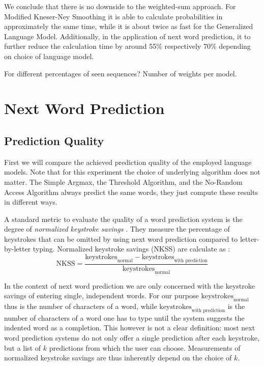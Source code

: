 We conclude that there is no downside to the weighted-sum approach.
For Modified Kneser-Ney Smoothing it is able to calculate probabilities in
approximately the same time, while it is about twice as fast for the
Generalized Language Model.
Additionally, in the application of next word prediction,  it to further reduce
the calculation time by around 55\% respectively 70\% depending on choice
of language model.

\begin{draft}
For different percentages of seen sequences?
Number of weights per model.
\end{draft}

\section{Next Word Prediction}
\label{sec:evaluation-topkjoin}

\subsection{Prediction Quality}
\label{subsec:evaluation-topkjoin-quality}

First we will compare the achieved prediction quality of the employed
language models.
Note that for this experiment the choice of underlying algorithm does not
matter.
The Simple Argmax, the Threshold Algorithm, and the No-Random Access Algorithm
always predict the same words, they just compute these results in different
ways.

A standard metric to evaluate the quality of a word prediction system is the
degree of \emph{normalized keystroke savings}
\parencite{Swiffin1987,Bickel2005,Trnka2011}.
They measure the percentage of keystrokes that can be omitted by using next
word prediction compared to letter-by-letter typing.
Normalized keystroke savings (NKSS) are calculate as \parencite{Trnka2011}:
\begin{equation}
  \text{NKSS} = \frac{\text{keystrokes}_\text{normal} - \text{keystrokes}_\text{with prediction}}
                     {\text{keystrokes}_\text{normal}}
\end{equation}

In the context of next word prediction we are only concerned with the keystroke
savings of entering single, independent words.
For our purpose $\text{keystrokes}_\text{normal}$ thus is the number of
characters of a word, while $\text{keystrokes}_\text{with prediction}$ is
the number of characters of a word one has to type until the system suggests
the indented word as a completion.
This however is not a clear definition: most next word prediction systems do not
only offer a single prediction after each keystroke, but a list of $k$
predictions from which the user can choose.
Measurements of normalized keystroke savings are thus inherently depend on the
choice of $k$.

